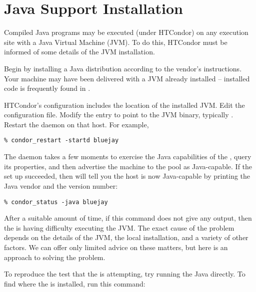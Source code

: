 \section{\label{sec:java-install}Java Support Installation}


Compiled Java programs may be executed (under HTCondor) on
any
execution site with a
Java Virtual Machine (JVM).
To do this,
HTCondor must be informed of some details of the
JVM installation.

Begin by installing a Java distribution according to the vendor's
instructions.
Your machine may have
been delivered with a JVM already installed -- installed code
is frequently found in .

HTCondor's configuration includes the location of the installed
JVM.
Edit the configuration file.
Modify the  entry to point to the JVM binary,
typically .
Restart the  daemon on that host.  For example,

\begin{verbatim}
% condor_restart -startd bluejay
\end{verbatim}

The  daemon takes a few moments to exercise the Java
capabilities of the , query its properties,
and then advertise the machine
to the pool as Java-capable.
If the set up succeeded, then  will
tell you the host is now Java-capable by printing the Java
vendor and the version number:

\begin{verbatim}
% condor_status -java bluejay
\end{verbatim}

After a suitable amount of time, if this command does not give any output,
then the   is having difficulty executing the JVM.
The exact cause of the problem depends on the details of the
JVM, the local installation, and a variety of other factors.
We can offer only limited advice on these matters,
but here is an approach to solving the problem.

To reproduce the test that the  is attempting,
try running the Java  directly.  To find
where the  is installed, run this command:


